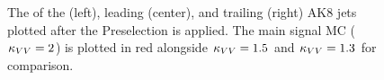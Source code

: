 \begin{figure}[htb]
    \centering
    \caption[The \pt distribution for each of the three VBS \VVH AK8 jets]{
        The \pt of the \Htobb (left), leading \Vtoqq (center), and trailing \Vtoqq (right) AK8 jets plotted after the Preselection is applied. 
        The main signal MC ($\kappa_{VV} = 2$) is plotted in red alongside $\kappa_{VV} = 1.5$ and $\kappa_{VV} = 1.3$ for comparison. 
    }
    \label{fig:vbsvvh_fatjet_pts}
\end{figure}

